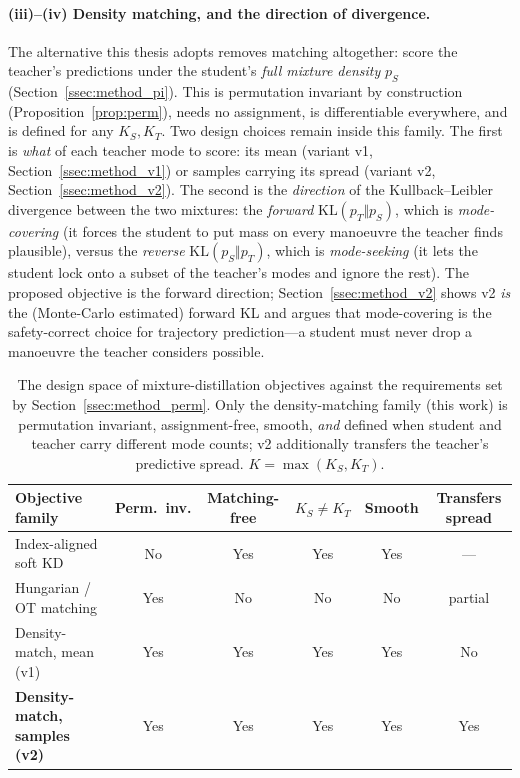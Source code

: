 \paragraph{(iii)--(iv) Density matching, and the direction of divergence.} The
alternative this thesis adopts removes matching altogether: score the teacher's
predictions under the student's \emph{full mixture density} $p_S$
(Section~\ref{ssec:method_pi}). This is permutation invariant by construction
(Proposition~\ref{prop:perm}), needs no assignment, is differentiable everywhere,
and is defined for any $K_S,K_T$. Two design choices remain inside this family. The
first is \emph{what} of each teacher mode to score: its mean (variant v1,
Section~\ref{ssec:method_v1}) or samples carrying its spread (variant v2,
Section~\ref{ssec:method_v2}). The second is the \emph{direction} of the
Kullback--Leibler divergence between the two mixtures: the \emph{forward}
$\mathrm{KL}(p_T\Vert p_S)$, which is \emph{mode-covering} (it forces the student to
put mass on every manoeuvre the teacher finds plausible), versus the \emph{reverse}
$\mathrm{KL}(p_S\Vert p_T)$, which is \emph{mode-seeking} (it lets the student lock
onto a subset of the teacher's modes and ignore the rest). The proposed objective is the
forward direction; Section~\ref{ssec:method_v2} shows v2 \emph{is} the (Monte-Carlo
estimated) forward KL and argues that mode-covering is the safety-correct choice for
trajectory prediction---a student must never drop a manoeuvre the teacher considers
possible.

\begin{table}[htbp]
  \centering
  \caption[Design space of mixture distillation objectives.]{The design space of
    mixture-distillation objectives against the requirements set by
    Section~\ref{ssec:method_perm}. Only the density-matching family (this work) is
    permutation invariant, assignment-free, smooth, \emph{and} defined when
    student and teacher carry different mode counts; v2 additionally transfers the
    teacher's predictive spread. $K=\max(K_S,K_T)$.}
  \label{tab:design}
  \begin{tabular}{lccccc}
    \toprule
    Objective family & Perm.\ inv. & Matching-free & $K_S{\neq}K_T$ & Smooth & Transfers spread \\
    \midrule
    Index-aligned soft KD          & No  & Yes & Yes & Yes & --- \\
    Hungarian / OT matching        & Yes & No  & No  & No  & partial \\
    Density-match, mean (v1)       & Yes & Yes & Yes & Yes & No \\
    \textbf{Density-match, samples (v2)} & Yes & Yes & Yes & Yes & Yes \\
    \bottomrule
  \end{tabular}
\end{table}

